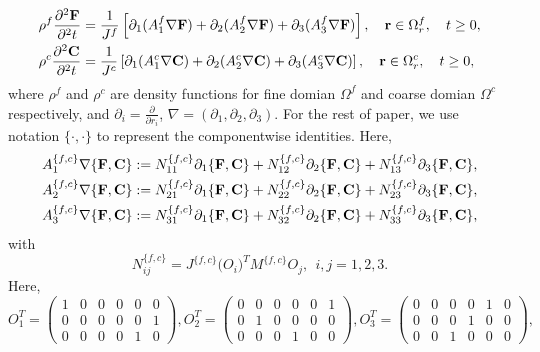 \begin{align}\label{elastic_curvi}
	\rho^f\frac{\partial^2{\bf F}}{\partial^2 t} &= \frac{1}{J^f}\left[\partial_1(A_1^f\nabla{\bf F}) + \partial_2(A_2^f\nabla{\bf F}) +\partial_3(A_3^f\nabla{\bf F}) \right], \ \ \  {\bf r}\in\Omega^f_r,\ \ \  t\geq0,\nonumber\\
	\rho^c\frac{\partial^2{\bf C}}{\partial^2 t} &= \frac{1}{J^c}\left[\partial_1(A_1^c\nabla{\bf C}) + \partial_2(A_2^c\nabla{\bf C}) +\partial_3(A_3^c\nabla{\bf C}) \right],\ \ \  {\bf r}\in\Omega^c_r,\ \ \  t\geq0,
\end{align}
where $\rho^f$ and $\rho^c$ are density functions for fine domian $\Omega^f$ and coarse domian $\Omega^c$ respectively, and $\partial_i = \frac{\partial}{\partial r_i}$, $\nabla = (\partial_1,\partial_2,\partial_3)$.  For the rest of paper, we use notation $\{\cdot,\cdot\}$ to represent the componentwise identities. Here,
\begin{align*} 
	A_1^{\{f,c\}}\nabla\{{\bf F}, {\bf C}\} &:= N_{11}^{\{f,c\}}\partial_1\{{\bf F}, {\bf C}\} + N_{12}^{\{f,c\}}\partial_2\{{\bf F}, {\bf C}\} + N_{13}^{\{f,c\}}\partial_3\{{\bf F}, {\bf C}\}, \\
	A_2^{\{f,c\}}\nabla\{{\bf F}, {\bf C}\} &:= N_{21}^{\{f,c\}}\partial_1\{{\bf F}, {\bf C}\} + N_{22}^{\{f,c\}}\partial_2\{{\bf F}, {\bf C}\} + N_{23}^{\{f,c\}}\partial_3\{{\bf F}, {\bf C}\}, \\
	A_3^{\{f,c\}}\nabla\{{\bf F}, {\bf C}\} &:= N_{31}^{\{f,c\}}\partial_1\{{\bf F}, {\bf C}\} + N_{32}^{\{f,c\}}\partial_2\{{\bf F}, {\bf C}\} + N_{33}^{\{f,c\}}\partial_3\{{\bf F}, {\bf C}\},
\end{align*}
with
\begin{equation}\label{N_definition}
	N_{ij}^{\{f,c\}} = J^{\{f,c\}}\big(O_i\big)^TM^{\{f,c\}}O_j, \ \ i,j = 1,2,3.
\end{equation}
Here, 
\[ O_{1}^T = \left(\begin{array}{cccccc}
1 & 0 & 0 &0 & 0 & 0\\
0 & 0 & 0 &0 & 0 & 1\\
0 & 0 & 0 &0 & 1 & 0\end{array}\right),  O_{2}^T = \left(\begin{array}{cccccc}
0 & 0 & 0 &0 & 0 & 1\\
0 & 1 & 0 &0 & 0 & 0\\
0 & 0 & 0 &1 & 0 & 0\end{array}\right),  O_{3}^T = \left(\begin{array}{cccccc}
0 & 0 & 0 &0 & 1 & 0\\
0 & 0 & 0 &1 & 0 & 0\\
0 & 0 & 1 &0 & 0 & 0\end{array}\right),\]
